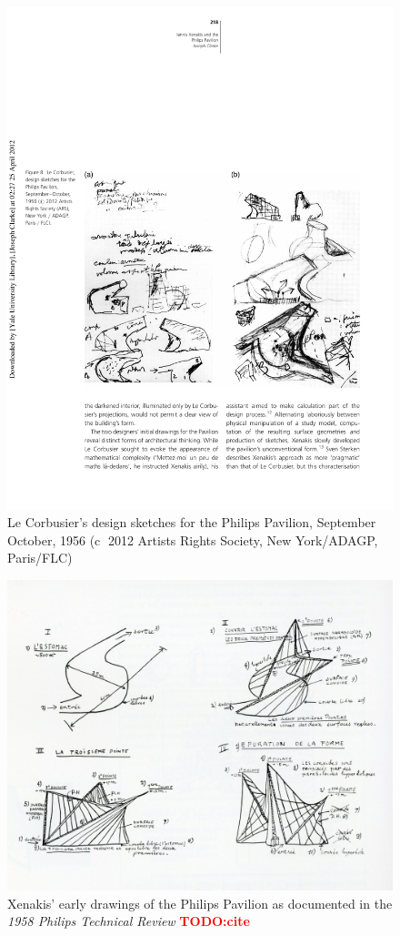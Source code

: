 \documentclass{tufte-book}
\newcommand{\TODO}[1]{\textcolor{red}{\bf TODO:#1}\xspace}
\begin{document}
\begin{figure}[h]
  \includegraphics[width=\linewidth]{LeCorbusierDraw.pdf}
  \caption{Le Corbusier's design sketches for the Philips Pavilion,
    September \textendash{} October, 1956 (\textcircled{c} 2012
    Artists Rights Society, New York/ADAGP, Paris/FLC)}
  \label{fig:le-corbusier-sketch}
\end{figure}

\begin{figure}[h]
  \includegraphics[width=\linewidth]{PhilipsDrawings.jpg}
  \caption{Xenakis' early drawings of the Philips Pavilion as
    documented in the \textit{1958 Philips Technical Review} \TODO{cite}}
  \label{fig:xenakis-draw}
\end{figure}
\end{document}
